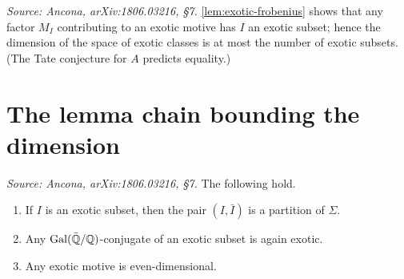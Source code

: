 \begin{remark}
  \label{rem:exotic-completare}
  \textit{Source: Ancona, arXiv:1806.03216, §7.}
  \cref{lem:exotic-frobenius} shows that any factor \(M_I\) contributing to an
  exotic motive has \(I\) an exotic subset; hence the dimension of the space of
  exotic classes is at most the number of exotic subsets. (The Tate conjecture
  for \(A\) predicts equality.)
\end{remark}

\section*{The lemma chain bounding the dimension}

\begin{lemma}
  \label{lem:exotic-partition}
  \textit{Source: Ancona, arXiv:1806.03216, §7.}
  The following hold.
  \begin{enumerate}
    \item If \(I\) is an exotic subset, then the pair \((I, \bar I)\) is a
      partition of \(\Sigma\).
    \item Any \(\mathrm{Gal}(\bar{\mathbb{Q}}/\mathbb{Q})\)-conjugate of an exotic subset is again exotic.
    \item Any exotic motive is even-dimensional.
  \end{enumerate}
\end{lemma}

